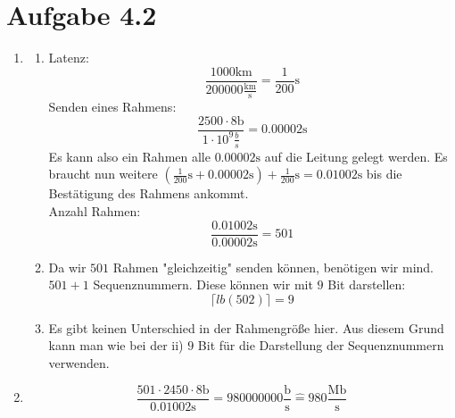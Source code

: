 \documentclass[12pt, a4paper]{article}
\begin{document}
\newpage


\section*{Aufgabe 4.2}
\begin{enumerate}[label=\alph*)]
	\item	\begin{enumerate}[label=\roman*)]
				\item	Latenz: $$\frac{1000 \text{km}}{200000 \frac{\text{km}}{\text{s}}} = \frac{1}{200} \text{s}$$
						Senden eines Rahmens: $$\frac{2500 \cdot 8 \text{b}}{1 \cdot 10^9 \frac{b}{s}} = 0.00002 \text{s}$$
						Es kann also ein Rahmen alle $0.00002 \text{s}$ auf die Leitung gelegt werden. Es braucht nun weitere $(\frac{1}{200} \text{s} + 0.00002 \text{s}) + \frac{1}{200} \text{s} = 0.01002 \text{s}$ bis die Bestätigung des Rahmens ankommt.\\
						Anzahl Rahmen: $$\frac{0.01002 \text{s}}{0.00002 \text{s}} = 501$$
				\item	Da wir $501$ Rahmen "gleichzeitig" senden können, benötigen wir mind. $501 + 1$ Sequenznummern. Diese können wir mit $9$ Bit darstellen: $$\lceil lb(502) \rceil = 9$$
				\item	Es gibt keinen Unterschied in der Rahmengröße hier. Aus diesem Grund kann man wie bei der ii) $9$ Bit für die Darstellung der Sequenznummern verwenden.
			\end{enumerate}
	\item	$$\frac{501 \cdot 2450 \cdot 8 \text{b}}{0.01002 \text{s}} = 980000000 \frac{\text{b}}{\text{s}} \hat{=} 980 \frac{\text{Mb}}{\text{s}}$$
\end{enumerate}


\newpage
\end{document}
